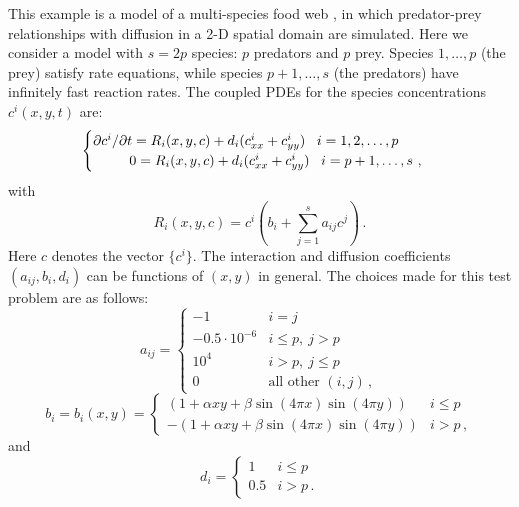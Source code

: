 This example is a model of a multi-species food web \cite{Bro:86}, in
which predator-prey relationships with diffusion in a 2-D spatial
domain are simulated.  Here we consider a model with $s = 2p$ species:
$p$ predators and $p$ prey.  Species $1,\ldots, p$ (the prey) satisfy
rate equations, while species $p+1,\ldots, s$ (the predators) have
infinitely fast reaction rates.  The coupled PDEs for the species
concentrations $c^i(x,y,t)$ are:
\begin{equation}\label{e:idaFoodWeb_PDE}
  \begin{cases}
    \partial c^i / \partial t = R_i(x,y,c) + d_i 
    ( c^i_{xx} + c^i_{yy} ) \, ~~ i = 1,2,\ldots,p \\
    \hspace*{.36in}        0 = R_i(x,y,c) + d_i 
    ( c^i_{xx} + c^i_{yy} ) \, ~~ i = p+1,\ldots,s ~,
  \end{cases}
\end{equation}
with
\[
R_i(x,y,c) = c^i \left( b_i + \sum_{j=1}^s a_{ij} c^j \right) \, .
\]
Here $c$ denotes the vector $\{c^i\}$.
The interaction and diffusion coefficients $(a_{ij},b_i,d_i)$ can be
functions of $(x,y)$ in general. The choices made for this test
problem are as follows:
\begin{equation*}
  a_{ij} = 
  \begin{cases}
    -1                 & i=j \\
    -0.5 \cdot 10^{-6} & i \leq p , ~ j > p  \\
    10^4               & i > p , ~ j \leq p  \\
    0                  & \mbox{all other } (i,j) \, ,
  \end{cases}
\end{equation*}
\begin{equation*}
  b_i = b_i(x,y) = 
  \begin{cases}
    (1 + \alpha xy + \beta \sin(4\pi x)\sin(4\pi y) )  & i \leq p  \\
    - (1 + \alpha xy + \beta \sin(4\pi x)\sin(4\pi y) )  & i > p \, ,
  \end{cases}
\end{equation*}
and
\begin{equation*}
  d_i = 
  \begin{cases}
    1 & i \leq p  \\
    0.5 & i > p  \, .
  \end{cases}
\end{equation*}

